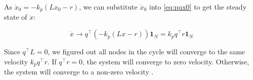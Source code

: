 \documentclass[letterpaper, 10 pt, conference]{ieeeconf}  %
\begin{document}
As \(\dot{x}_0 = -k_p(Lx_0 - r)\), we can substitute \(\dot{x}_0\) into \eqref{eq:pqx0} to get the steady state of \(\dot{x}\):

\begin{equation}\label{eq:steady}
    \dot{x} \rightarrow    q^\top (-k_p (Lx -r))\mathbf{1}_N
    = k_p q^\top r \mathbf{1}_N
\end{equation}

\noindent Since \(q^\top L = 0\), we figured out all nodes in the cycle will converge to the same velocity \(k_p q^\top r\). If \(q^\top r = 0\), the system will converge to zero velocity. Otherwise, the system will converge to a non-zero velocity \cite{dimarogonas_connection_2008}. 








\end{document}
